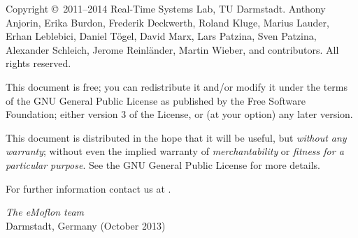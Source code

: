 \begin{small} 
Copyright \copyright~2011--2014 Real-Time Systems Lab, TU Darmstadt.
Anthony Anjorin, Erika Burdon, Frederik Deckwerth, Roland Kluge, Marius Lauder,
Erhan Leblebici, Daniel T\"ogel, David Marx, Lars Patzina, Sven Patzina, Alexander
Schleich, Jerome Reinl\"ander, Martin Wieber, and contributors.
All rights reserved.

This document is free; you can redistribute it and/or modify it under the terms of the GNU General Public License as published by the Free Software Foundation; either version 3 of the License, or (at your option) any later version.
 
This document is distributed in the hope that it will be useful, but \emph{without any warranty}; without even the implied warranty of \emph{merchantability} or \emph{fitness for a particular purpose}.
See the GNU General Public License for more details.
 
  
For further information contact us at
\eMoflonContact.
  
\vskip3cm
\textit{The eMoflon team}\\
Darmstadt, Germany (October 2013)
\end{small}